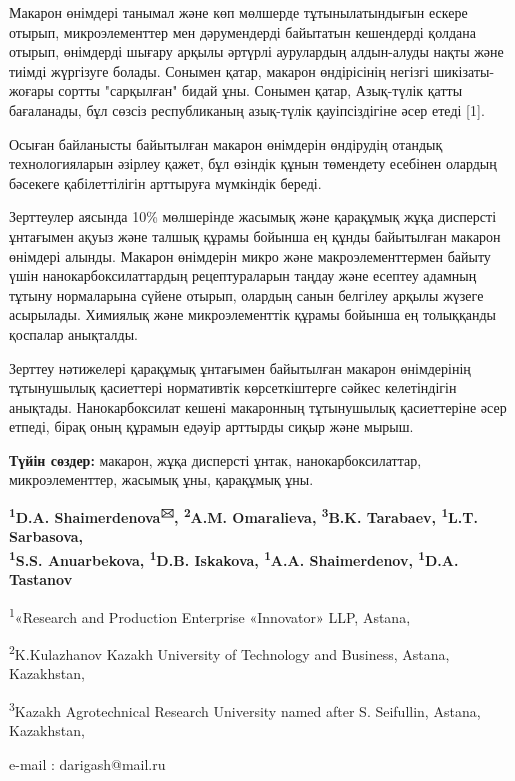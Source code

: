 Макарон өнімдері танымал және көп мөлшерде тұтынылатындығын ескере
отырып, микроэлементтер мен дәрумендерді байытатын кешендерді қолдана
отырып, өнімдерді шығару арқылы әртүрлі аурулардың алдын-алуды нақты
және тиімді жүргізуге болады. Сонымен қатар, макарон өндірісінің негізгі
шикізаты-жоғары сортты "сарқылған" бидай ұны. Сонымен қатар, Азық-түлік
қатты бағаланады, бұл сөзсіз республиканың азық-түлік қауіпсіздігіне
әсер етеді {[}1{]}.

Осыған байланысты байытылған макарон өнімдерін өндірудің отандық
технологияларын әзірлеу қажет, бұл өзіндік құнын төмендету есебінен
олардың бәсекеге қабілеттілігін арттыруға мүмкіндік береді.

Зерттеулер аясында 10\% мөлшерінде жасымық және қарақұмық жұқа дисперсті
ұнтағымен ақуыз және талшық құрамы бойынша ең құнды байытылған макарон
өнімдері алынды. Макарон өнімдерін микро және макроэлементтермен байыту
үшін нанокарбоксилаттардың рецептураларын таңдау және есептеу адамның
тұтыну нормаларына сүйене отырып, олардың санын белгілеу арқылы жүзеге
асырылады. Химиялық және микроэлементтік құрамы бойынша ең толыққанды
қоспалар анықталды.

Зерттеу нәтижелері қарақұмық ұнтағымен байытылған макарон өнімдерінің
тұтынушылық қасиеттері нормативтік көрсеткіштерге сәйкес келетіндігін
анықтады. Нанокарбоксилат кешені макаронның тұтынушылық қасиеттеріне
әсер етпеді, бірақ оның құрамын едәуір арттырды сиқыр және мырыш.

{\bfseries Түйін сөздер:} макарон, жұқа дисперсті ұнтак,
нанокарбоксилаттар, микроэлементтер, жасымық ұны, қарақұмық ұны.

\begin{center}

{\bfseries \textsuperscript{1}D.A. Shaimerdenova\textsuperscript{🖂},
\textsuperscript{2}A.M. Omaralieva, \textsuperscript{3}B.K. Tarabaev,
\textsuperscript{1}L.T. Sarbasova,\\
\textsuperscript{1}S.S. Anuarbekova, \textsuperscript{1}D.B. Iskakova,
\textsuperscript{1}A.A. Shaimerdenov, \textsuperscript{1}D.A. Tastanov}

\textsuperscript{1}«Research and Production Enterprise «Innovator» LLP,
Astana,

\textsuperscript{2}K.Kulazhanov Kazakh University of Technology and
Business, Astana, Kazakhstan,

\textsuperscript{3}Kazakh Agrotechnical Research University named after
S. Seifullin, Astana, Kazakhstan,

e-mail : darigash@mail.ru
\end{center}

